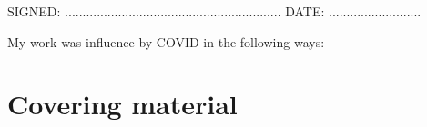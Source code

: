 \documentclass[a4paper, twoside]{templates/ociamthesis}
\begin{document}
\begin{romanpages}
\begin{declaration}
  \begin{flushright}
  SIGNED: .............................................................         DATE: ..........................\\
  \end{flushright}
\end{declaration}

\begin{covidStatment}
 	My work was influence by COVID in the following ways:
\end{covidStatment}

  \dominitoc %

\flushbottom

\tableofcontents

\listoffigures
	\mtcaddchapter

\listoftables
  \mtcaddchapter


\end{romanpages}

\flushbottom

\hypertarget{covering-material}{%
\chapter*{Covering material}\label{covering-material}}
\end{document}
